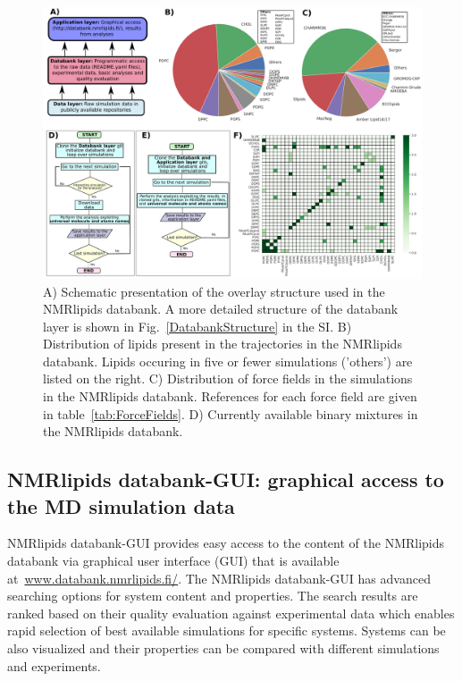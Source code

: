 \documentclass[fleqn,10pt]{wlscirep}
\begin{document}
\begin{figure}[t]
    \centering
    \includegraphics[width=\linewidth]{Figures/overlay3.pdf}
    \caption{A) Schematic presentation of the overlay structure used in the NMRlipids databank. A more detailed structure of the databank layer is shown in Fig.~\ref{DatabankStructure} in the SI.
    B) Distribution of lipids present in the trajectories in the NMRlipids databank. Lipids occuring in five or fewer simulations ('others') are listed on the right. 
    C) Distribution of force fields in the simulations in the NMRlipids databank. References for each force field are given in table~\ref{tab:ForceFields}.
    D) Currently available binary mixtures in the NMRlipids databank. 
    }
    \label{fig:overlay}
\end{figure}

\subsection{NMRlipids databank-GUI: graphical access to the MD simulation data}\label{section:access}
NMRlipids databank-GUI provides easy access to the content of the NMRlipids databank via graphical user interface (GUI) that is available at~\url{www.databank.nmrlipids.fi/}. The NMRlipids databank-GUI has advanced searching options for system content and properties. The search results are ranked based on their quality evaluation against experimental data which enables rapid selection of best available simulations for specific systems.  Systems can be also visualized and their properties can be compared with different simulations and experiments. 
\end{document}
